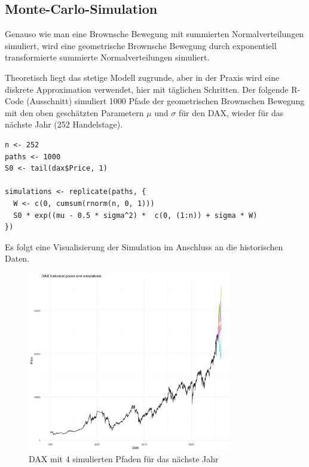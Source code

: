 \subsection{Monte-Carlo-Simulation}

Genauso wie man eine Brownsche Bewegung mit summierten Normalverteilungen simuliert, 
wird eine geometrische Brownsche Bewegung durch exponentiell transformierte
summierte Normalverteilungen simuliert. 


\begin{bsp}
Theoretisch liegt das stetige Modell zugrunde, 
aber in der Praxis wird eine diskrete Approximation verwendet, hier mit täglichen Schritten.
Der folgende R-Code (Ausschnitt) simuliert 1000 Pfade der geometrischen Brownschen Bewegung
mit den oben geschätzten Parametern $\mu$ und $\sigma$ für den DAX, wieder für das nächste Jahr (252 Handelstage).

\begin{lstlisting}
n <- 252
paths <- 1000
S0 <- tail(dax$Price, 1)

simulations <- replicate(paths, {
  W <- c(0, cumsum(rnorm(n, 0, 1)))
  S0 * exp((mu - 0.5 * sigma^2) *  c(0, (1:n)) + sigma * W)
})
\end{lstlisting}
Es folgt eine Visualisierung der Simulation im Anschluss an die historischen Daten.

\begin{figure}[H]
    \centering
    \includegraphics[width=0.8\textwidth]{images/dax_monte_carlo.png}
    \caption{DAX mit 4 simulierten Pfaden für das nächste Jahr}
    \label{fig:dax_monte_carlo}
\end{figure}

\end{bsp}

